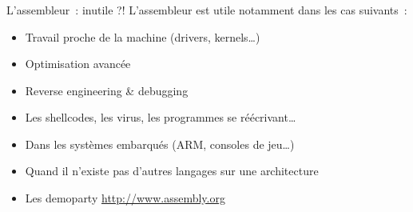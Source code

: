 \begin{frame}
  \frametitle{\secname}
  \framesubtitle{\subsecname}
  \begin{block}{L'assembleur~: inutile ?!}
   L'assembleur est utile notamment dans les cas suivants~:
  \begin{itemize}
    \item Travail proche de la machine (drivers, kernels\ldots)
    \item Optimisation avancée
    \item Reverse engineering \& debugging
    \item Les shellcodes, les virus, les programmes se réécrivant\ldots
    \item Dans les systèmes embarqués (ARM, consoles de jeu\ldots)
    \item Quand il n'existe pas d'autres langages sur une architecture
    \item Les demoparty \href{http://www.assembly.org}{http://www.assembly.org}
  \end{itemize}
 \end{block}
\end{frame}

